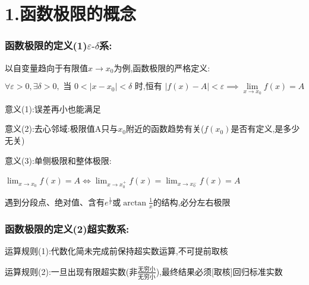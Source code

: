 \documentclass[11pt,a4paper,UTF8]{ctexart}
\begin{document}
\pagestyle{fancy}
\fancyhf{}
\fancyhead[R]{\small\color{TitlePurple}\nouppercase{\leftmark}}
\renewcommand{\headrulewidth}{0.5pt}

\tableofcontents
\newpage
{}



\section{1.函数极限的概念}


\subsubsection{函数极限的定义(1)$\varepsilon\text{-}\delta$系:}

以自变量趋向于有限值$x \to x_0$为例,函数极限的严格定义:


\begin{equation*}
\forall \varepsilon > 0, \exists \delta > 0, \text{ 当 } 0 < \vert{}x - x_0\vert{} < \delta \text{ 时,恒有 } \vert{}f(x) - A\vert{} < \varepsilon \implies \lim_{x \to x_0} f(x) = A
\end{equation*}

意义(1):误差再小也能满足

意义(2):去心邻域:极限值A只与$x_0$附近的函数趋势有关($f(x_0)$是否有定义,是多少无关)

意义(3):单侧极限和整体极限:

\begin{solbox}[{分步推导与答题规范}]
$\lim_{x \to x_0} f(x) = A \iff \lim_{x \to x_0^+} f(x) = \lim_{x \to x_0^-} f(x) = A$

遇到分段点、绝对值、含有$e^{\frac{1}{x}}$或$\arctan \frac{1}{x}$的结构,必分左右极限
\end{solbox}


\subsubsection{函数极限的定义(2)超实数系:}

运算规则(1):代数化简未完成前保持超实数运算,不可提前取核

运算规则(2):一旦出现有限超实数(非$\frac{\text{无穷小}}{\text{无穷小}}$),最终结果必须[取核]回归标准实数
\end{document}

